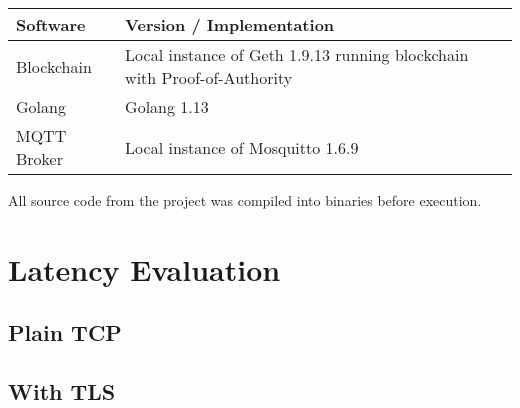 \begin{table}[]
\centering
\begin{tabular}{|l|l|}
\hline
\textbf{Software} & \textbf{Version / Implementation}                                        \\ \hline
Blockchain        & Local instance of Geth 1.9.13 running blockchain with Proof-of-Authority \\ \hline
Golang            & Golang 1.13                                                              \\ \hline
MQTT Broker       & Local instance of Mosquitto 1.6.9                                        \\ \hline
\end{tabular}
\end{table}

All source code from the project was compiled into binaries before execution.

\section{Latency Evaluation}
\subsection{Plain TCP}

\subsection{With TLS}

